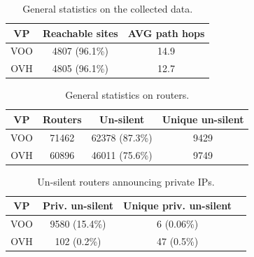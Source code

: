\documentclass[journal]{IEEEtran}
\begin{document}
\begin{table}[h]
    \begin{center}
        \begin{tabular}{ | c | c | c | }
            \hline
            VP   & Reachable sites & AVG path hops \\ \hline
            VOO  & 4807 (96.1\%)   & 14.9          \\ \hline
            OVH  & 4805 (96.1\%)   & 12.7          \\
            \hline
        \end{tabular}
    \end{center}
    \caption{General statistics on the collected data.}
    \label{tab:general_stats}
\end{table}

\begin{table}[h]
    \begin{center}
        \begin{tabular}{ | c | c | c | c | }
            \hline
            VP   & Routers & Un-silent      & Unique un-silent   \\ \hline
            VOO  & 71462   & 62378 (87.3\%) & 9429               \\ \hline
            OVH  & 60896   & 46011 (75.6\%) & 9749               \\
            \hline
        \end{tabular}
    \end{center}
    \caption{General statistics on routers.}
    \label{tab:router_stats}
\end{table}

\begin{table}[h]
    \begin{center}
        \begin{tabular}{ | c | c | c | c | }
            \hline
            VP   & Priv. un-silent & Unique priv. un-silent \\ \hline
            VOO  & 9580 (15.4\%)             & 6 (0.06\%)   \\ \hline
            OVH  & 102 (0.2\%)               & 47 (0.5\%)   \\
            \hline
        \end{tabular}
    \end{center}
    \caption{Un-silent routers announcing private IPs.}
    \label{tab:private_routers}
\end{table}
\end{document}
